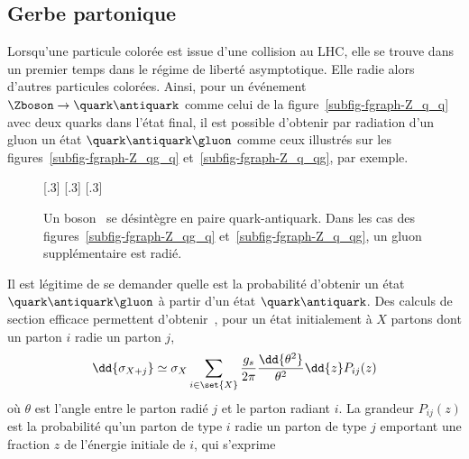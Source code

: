 \subsection{Gerbe partonique}\label{chapter-JERC-section-jets-subsec-gerbe-partonique}
Lorsqu'une particule colorée est issue d'une collision au LHC, elle se trouve dans un premier temps dans le régime de liberté asymptotique. Elle radie alors d'autres particules colorées. Ainsi, pour un événement $\Zboson\to\quark\antiquark$ comme celui de la figure~\ref{subfig-fgraph-Z_q_q} avec deux quarks dans l'état final, il est possible d'obtenir par radiation d'un gluon un état $\quark\antiquark\gluon$ comme ceux illustrés sur les figures~\ref{subfig-fgraph-Z_qg_q} et~\ref{subfig-fgraph-Z_q_qg}, par exemple.
\begin{figure}[h]
\centering\vspace{\baselineskip}
\subcaptionbox{\label{subfig-fgraph-Z_q_q}}[.3\textwidth]
{\vspace{\baselineskip}}
\hfill
\subcaptionbox{\label{subfig-fgraph-Z_qg_q}}[.3\textwidth]
{\vspace{\baselineskip}}
\hfill
\subcaptionbox{\label{subfig-fgraph-Z_q_qg}}[.3\textwidth]
{\vspace{\baselineskip}}
\caption[Un boson \Zboson\ se désintègre en paire quark-antiquark.]{Un boson \Zboson\ se désintègre en paire quark-antiquark. Dans les cas des figures~\ref{subfig-fgraph-Z_qg_q} et~\ref{subfig-fgraph-Z_q_qg}, un gluon supplémentaire est radié.}
\label{fig-fgraph-Z_q_q_xg}
\end{figure}
\par Il est légitime de se demander quelle est la probabilité d'obtenir un état $\quark\antiquark\gluon$ à partir d'un état $\quark\antiquark$.
Des calculs de section efficace permettent d'obtenir~\cite{salam2010elements}, pour un état initialement à $X$ partons dont un parton $i$ radie un parton $j$,
\begin{equation}
\dd{\sigma_{X+j}} \simeq \sigma_{X} \sum_{i\in\set{X}} \frac{g_s}{2\pi} \frac{\dd{\theta^2}}{\theta^2} \dd{z} P_{ij}(z)
\end{equation}
où $\theta$ est l'angle entre le parton radié $j$ et le parton radiant $i$. La grandeur $P_{ij}(z)$ est la probabilité qu'un parton de type $i$ radie un parton de type $j$ emportant une fraction $z$ de l'énergie initiale de $i$, qui s'exprime
